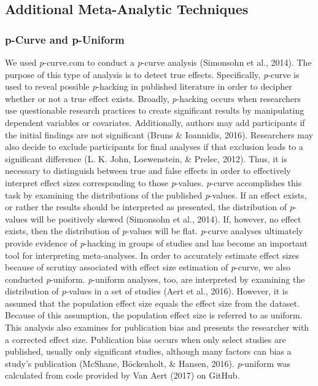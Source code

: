 \documentclass[english,man, mask]{apa6}
\newcounter{author}
\theoremstyle{definition}
\theoremstyle{definition}
\theoremstyle{definition}
\theoremstyle{remark}
\begin{document}
\subsection{Additional Meta-Analytic
Techniques}\label{additional-meta-analytic-techniques}

\subsubsection{p-Curve and p-Uniform}\label{p-curve-and-p-uniform}

We used \emph{p}-curve.com to conduct a \emph{p}-curve analysis
(Simonsohn et al., 2014). The purpose of this type of analysis is to
detect true effects. Specifically, \emph{p}-curve is used to reveal
possible \emph{p}-hacking in published literature in order to decipher
whether or not a true effect exists. Broadly, \emph{p}-hacking occurs
when researchers use questionable research practices to create
significant results by manipulating dependent variables or covariates.
Additionally, authors may add participants if the initial findings are
not significant (Bruns \& Ioannidis, 2016). Researchers may also decide
to exclude participants for final analyses if that exclusion leads to a
significant difference (L. K. John, Loewenstein, \& Prelec, 2012). Thus,
it is necessary to distinguish between true and false effects in order
to effectively interpret effect sizes corresponding to those
\emph{p}-values. \emph{p}-curve accomplishes this task by examining the
distributions of the published \emph{p}-values. If an effect exists, or
rather the results should be interpreted as presented, the distribution
of \emph{p}-values will be positively skewed (Simonsohn et al., 2014).
If, however, no effect exists, then the distribution of \emph{p}-values
will be flat. \emph{p}-curve analyses ultimately provide evidence of
\emph{p}-hacking in groups of studies and has become an important tool
for interpreting meta-analyses. In order to accurately estimate effect
sizes because of scrutiny associated with effect size estimation of
\emph{p}-curve, we also conducted \emph{p}-uniform. \emph{p}-uniform
analyses, too, are interpreted by examining the distribution of
\emph{p}-values in a set of studies (Aert et al., 2016). However, it is
assumed that the population effect size equals the effect size from the
dataset. Because of this assumption, the population effect size is
referred to as uniform. This analysis also examines for publication bias
and presents the researcher with a corrected effect size. Publication
bias occurs when only select studies are published, usually only
significant studies, although many factors can bias a study's
publication (McShane, Böckenholt, \& Hansen, 2016). \emph{p}-uniform was
calculated from code provided by Van Aert (2017) on GitHub.
\end{document}
